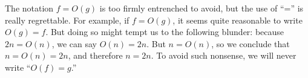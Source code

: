 The notation $f = O(g)$ is too firmly entrenched to avoid, but the use of
``='' is really regrettable.  For example, if $f = O(g)$, it seems quite
reasonable to write $O(g) = f$.  But doing so might tempt us to the
following blunder: because $2n = O(n)$, we can say $O(n) = 2n$.  But $n =
O(n)$, so we conclude that $n = O(n) = 2n$, and therefore $n = 2n$.  To
avoid such nonsense, we will never write ``$O(f) = g$.''

\begin{problems}
\practiceproblems
{}

\homeworkproblems
{}

\classproblems
{}
\end{problems}

\endinput
